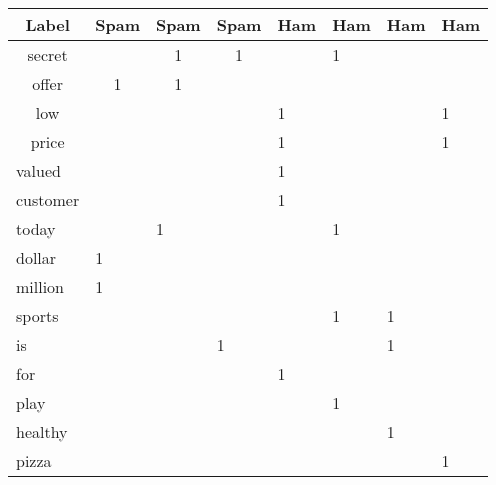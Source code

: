 \documentclass[12pt, letterpaper]{article}
\begin{document}
\begin{center}
\begin{tabular}{l|lllllll}
\multicolumn{1}{c|}{Label}  & \multicolumn{1}{c}{Spam} & \multicolumn{1}{c}{Spam} & \multicolumn{1}{c}{Spam} & Ham & Ham & Ham & Ham \\ \hline
\multicolumn{1}{c|}{secret} & \multicolumn{1}{c}{}     & \multicolumn{1}{c}{1}    & \multicolumn{1}{c}{1}    &     & 1   &     &     \\
\multicolumn{1}{c|}{offer} & \multicolumn{1}{c}{1} & \multicolumn{1}{c}{1} & \multicolumn{1}{c}{} &   &   &   &   \\
\multicolumn{1}{c|}{low}   & \multicolumn{1}{c}{}  & \multicolumn{1}{c}{}  & \multicolumn{1}{c}{} & 1 &   &   & 1 \\
\multicolumn{1}{c|}{price} & \multicolumn{1}{c}{}  & \multicolumn{1}{c}{}  & \multicolumn{1}{c}{} & 1 &   &   & 1 \\
valued                     &                       &                       &                      & 1 &   &   &   \\
customer                   &                       &                       &                      & 1 &   &   &   \\
today                      &                       & 1                     &                      &   & 1 &   &   \\
dollar                     & 1                     &                       &                      &   &   &   &   \\
million                    & 1                     &                       &                      &   &   &   &   \\
sports                     &                       &                       &                      &   & 1 & 1 &   \\
is                         &                       &                       & 1                    &   &   & 1 &   \\
for                        &                       &                       &                      & 1 &   &   &   \\
play                       &                       &                       &                      &   & 1 &   &   \\
healthy                    &                       &                       &                      &   &   & 1 &   \\
pizza                      &                       &                       &                      &   &   &   & 1
\end{tabular}
\end{center}
\end{document}
